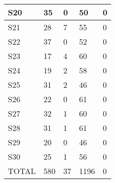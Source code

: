 \begin{table}[H]
\begin{tabular}{|l|p{2cm}|p{2cm}|l|p{2cm}|}
S20 & 35 & 0 & 50 & 0 \\ \hline
S21 & 28 & 7 & 55 & 0 \\ \hline
S22 & 37 & 0 & 52 & 0 \\ \hline
S23 & 17 & 4 & 60 & 0 \\ \hline
S24 & 19 & 2 & 58 & 0 \\ \hline
S25 & 31 & 2 & 46 & 0 \\ \hline
S26 & 22 & 0 & 61 & 0 \\ \hline
S27 & 32 & 1 & 60 & 0 \\ \hline
S28 & 31 & 1 & 61 & 0 \\ \hline
S29 & 20 & 0 & 46 & 0 \\ \hline
S30 & 25 & 1 & 56 & 0 \\ \hline
TOTAL & 580 & 37 & 1196 & 0 \\ \hline
\end{tabular}
\label{tab:mod2}
\end{table}

